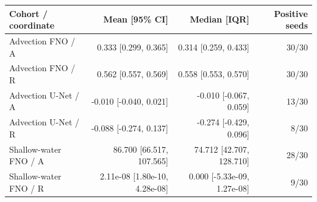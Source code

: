 \begin{tabular}{lrrr}
\toprule
Cohort / coordinate & Mean [95\% CI] & Median [IQR] & Positive seeds \\
\midrule
Advection FNO / A & 0.333 [0.299, 0.365] & 0.314 [0.259, 0.433] & 30/30 \\
Advection FNO / R & 0.562 [0.557, 0.569] & 0.558 [0.553, 0.570] & 30/30 \\
Advection U-Net / A & -0.010 [-0.040, 0.021] & -0.010 [-0.067, 0.059] & 13/30 \\
Advection U-Net / R & -0.088 [-0.274, 0.137] & -0.274 [-0.429, 0.096] & 8/30 \\
Shallow-water FNO / A & 86.700 [66.517, 107.565] & 74.712 [42.707, 128.710] & 28/30 \\
Shallow-water FNO / R & 2.11e-08 [1.80e-10, 4.28e-08] & 0.000 [-5.33e-09, 1.27e-08] & 9/30 \\
\bottomrule
\end{tabular}
